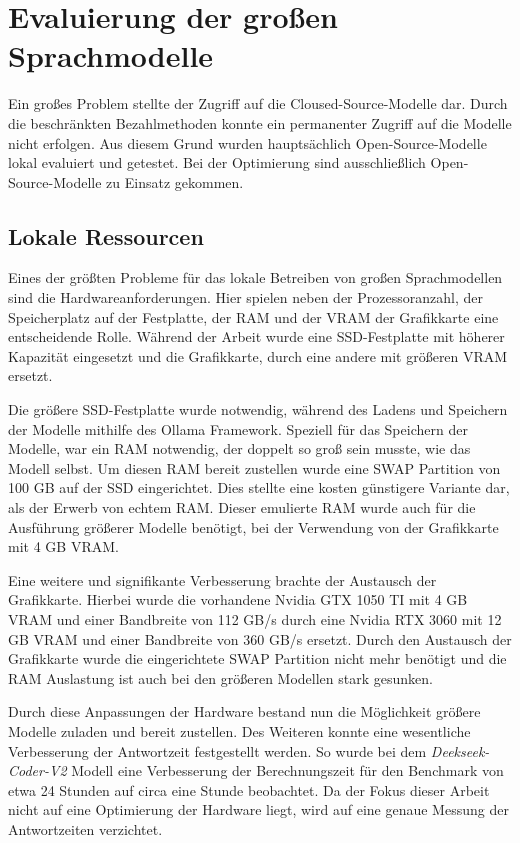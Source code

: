 \section{Evaluierung der großen Sprachmodelle}
Ein großes Problem stellte der Zugriff auf die Cloused-Source-Modelle dar. Durch die beschränkten Bezahlmethoden konnte ein permanenter Zugriff auf die Modelle nicht erfolgen. Aus diesem Grund wurden hauptsächlich Open-Source-Modelle lokal evaluiert und getestet. Bei der Optimierung sind ausschließlich Open-Source-Modelle zu Einsatz gekommen.


\subsection{Lokale Ressourcen}
Eines der größten Probleme für das lokale Betreiben von großen Sprachmodellen sind die Hardwareanforderungen. Hier spielen neben der Prozessoranzahl, der Speicherplatz auf der Festplatte, der RAM und der VRAM der Grafikkarte eine entscheidende Rolle. Während der Arbeit wurde eine SSD-Festplatte mit höherer Kapazität eingesetzt und die Grafikkarte, durch eine andere mit größeren VRAM ersetzt.\vspace{0.2cm}

Die größere SSD-Festplatte wurde notwendig, während des Ladens und Speichern der Modelle mithilfe des Ollama Framework. Speziell für das Speichern der Modelle, war ein RAM notwendig, der doppelt so groß sein musste, wie das Modell selbst. Um diesen RAM bereit zustellen wurde eine SWAP Partition von 100 GB auf der SSD eingerichtet. Dies stellte eine kosten günstigere Variante dar, als der Erwerb von echtem RAM. Dieser emulierte RAM wurde auch für die Ausführung größerer Modelle benötigt, bei der Verwendung von der Grafikkarte mit 4 GB VRAM.\vspace{0.2cm}

Eine weitere und signifikante Verbesserung brachte der Austausch der Grafikkarte. Hierbei wurde die vorhandene Nvidia GTX 1050 TI mit 4 GB VRAM und einer Bandbreite von 112 GB/s durch eine Nvidia RTX 3060 mit 12 GB VRAM und einer Bandbreite von 360 GB/s ersetzt. Durch den Austausch der Grafikkarte wurde die eingerichtete SWAP Partition nicht mehr benötigt und die RAM Auslastung ist auch bei den größeren Modellen stark gesunken.

Durch diese Anpassungen der Hardware bestand nun die Möglichkeit größere Modelle zuladen und bereit zustellen. Des Weiteren konnte eine wesentliche Verbesserung der Antwortzeit festgestellt werden. So wurde bei dem \textit{Deekseek-Coder-V2} Modell eine Verbesserung der Berechnungszeit für den Benchmark von etwa 24 Stunden auf circa eine Stunde beobachtet. Da der Fokus dieser Arbeit nicht auf eine Optimierung der Hardware liegt, wird auf eine genaue Messung der Antwortzeiten verzichtet.\vspace{0.2cm}

